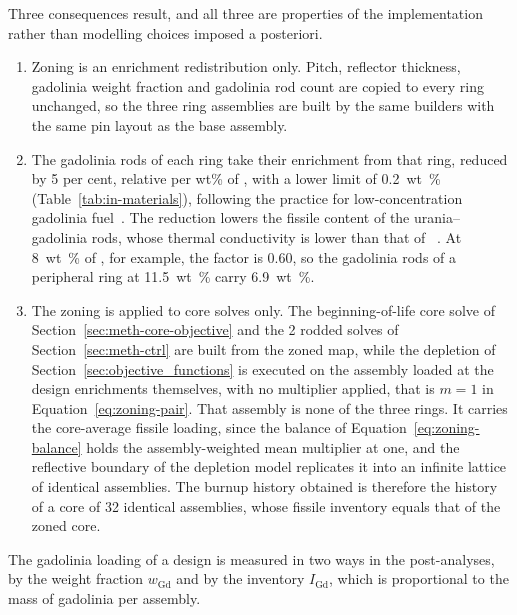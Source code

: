 Three consequences result, and all three are properties of the
implementation rather than modelling choices imposed a posteriori.

\begin{enumerate}
  \item Zoning is an enrichment redistribution only. Pitch, reflector
        thickness, gadolinia weight fraction and gadolinia rod count
        are copied to every ring unchanged, so the three ring
        assemblies are built by the same builders with the same pin
        layout as the base assembly.

  \item The gadolinia rods of each ring take their 
        enrichment from that ring, reduced by 5 per cent, relative per
        wt\% of , with a lower limit of \SI{0.2}{wt\%}
        (Table~\ref{tab:in-materials}), following the practice for
        low-concentration gadolinia fuel~\cite{mildrum_segovia_2001}.
        The reduction lowers the fissile
        content of the urania--gadolinia rods, whose thermal conductivity
        is lower than that of ~\cite{mildrum_segovia_2001}. At
        \SI{8}{wt\%} of , for example, the factor is 0.60, so
        the gadolinia rods of a peripheral ring at \SI{11.5}{wt\%} carry
        \SI{6.9}{wt\%}.

  \item The zoning is applied to core solves only. The beginning-of-life
        core solve of Section~\ref{sec:meth-core-objective} and the 2
        rodded solves of Section~\ref{sec:meth-ctrl} are built from the
        zoned map, while the depletion of
        Section~\ref{sec:objective_functions} is executed on the assembly
        loaded at the design enrichments themselves, with no multiplier
        applied, that is $m = 1$ in
        Equation~\eqref{eq:zoning-pair}. That assembly is none of the
        three rings. It carries the core-average fissile loading, since
        the balance of Equation~\eqref{eq:zoning-balance} holds the
        assembly-weighted mean multiplier at one, and the reflective
        boundary of the depletion model replicates it into an infinite
        lattice of identical assemblies. The burnup history obtained is
        therefore the history of a core of 32 identical assemblies, whose
        fissile inventory equals that of the zoned core.
\end{enumerate}

The gadolinia loading of a design is measured in two ways in the
post-analyses, by the weight fraction $w_\mathrm{Gd}$ and by the
inventory $I_\mathrm{Gd}$, which is proportional to the mass of
gadolinia per assembly.

